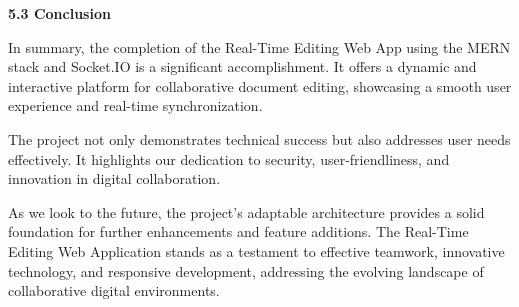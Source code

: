 \documentclass{article}
\begin{document}
\vspace{25pt}

{\Large\bfseries 5.3 Conclusion \\}

{\normalsize  In summary, the completion of the Real-Time Editing Web App using the MERN stack and Socket.IO is a significant accomplishment. It offers a dynamic and interactive platform for collaborative document editing, showcasing a smooth user experience and real-time synchronization.}

\vspace{10pt}
{ \normalsize
The project not only demonstrates technical success but also addresses user needs effectively. It highlights our dedication to security, user-friendliness, and innovation in digital collaboration.}

\vspace{10pt}
{\normalsize
     As we look to the future, the project's adaptable architecture provides a solid foundation for further enhancements and feature additions. The Real-Time Editing Web Application stands as a testament to effective teamwork, innovative technology, and responsive development, addressing the evolving landscape of collaborative digital environments. 
}

\vspace{25pt}
\end{document}
